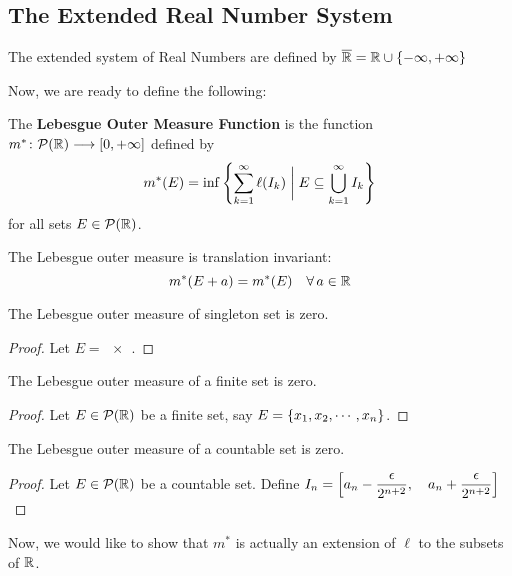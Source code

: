 \documentclass[a4paper]{book}
\begin{document}
\subsection{The Extended Real Number System}
\begin{definition}
The extended system of Real Numbers are defined by $\overline {\mathbb{R}} = \mathbb{R} \cup \qty{-\infty, +\infty}$
\end{definition}
Now, we are ready to define the following:
\begin{definition}
The {\bf Lebesgue Outer Measure Function} is the function $m^*\colon \mathcal{P}(\mathbb{R}) \longrightarrow [0, +\infty]$ defined by \[ m^*(E) = \inf \qty{\sum_{k=1}^\infty \ell(I_k)\biggm| E \subseteq \bigcup_{k=1}^{\infty} I_k} \] for all sets $E \in \mathcal{P}(\mathbb{R})$.
\end{definition}
\begin{theorem}
The Lebesgue outer measure is translation invariant:
\[ m^* (E + a) = m^*(E)\quad \forall\, a \in \mathbb{R}\]
\end{theorem}
\begin{theorem}
The Lebesgue outer measure of singleton set is zero.
\begin{proof}
Let $E = \qty{x}$.
\end{proof}
\end{theorem}
\begin{theorem}
The Lebesgue outer measure of a finite set is zero.
\begin{proof}
Let $E \in \mathcal{P}(\mathbb{R})$ be a finite set, say $E = \qty{x_1, x_2, \cdots, x_n}$.
\end{proof}
\end{theorem}
\begin{theorem}
The Lebesgue outer measure of a countable set is zero.
\begin{proof}
Let $E \in \mathcal{P}(\mathbb{R})$ be a countable set. Define $I_n = \qty[a_n - \dfrac{\epsilon}{2^{n+2}},\quad a_n + \dfrac{\epsilon}{2^{n+2}}]$
\end{proof}
\end{theorem}
\noindent Now, we would like to show that $m^*$ is actually an extension of $\ell$ to the subsets of $\mathbb{R}$. 
\end{document}
